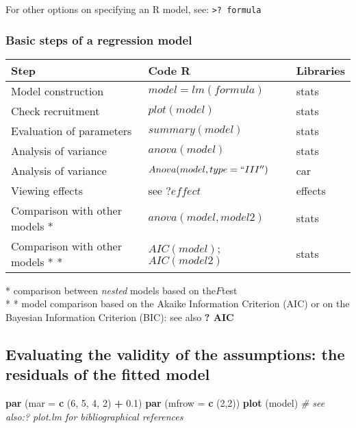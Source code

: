 \documentclass[
]{article}
\newenvironment{Shaded}{\begin{snugshade}}{\end{snugshade}}
\newcommand{\CommentTok}[1]{\textcolor[rgb]{0.56,0.35,0.01}{\textit{#1}}}
\newcommand{\DataTypeTok}[1]{\textcolor[rgb]{0.13,0.29,0.53}{#1}}
\newcommand{\DecValTok}[1]{\textcolor[rgb]{0.00,0.00,0.81}{#1}}
\newcommand{\FloatTok}[1]{\textcolor[rgb]{0.00,0.00,0.81}{#1}}
\newcommand{\KeywordTok}[1]{\textcolor[rgb]{0.13,0.29,0.53}{\textbf{#1}}}
\newcommand{\NormalTok}[1]{#1}
\newcommand{\OperatorTok}[1]{\textcolor[rgb]{0.81,0.36,0.00}{\textbf{#1}}}
\newcommand{\StringTok}[1]{\textcolor[rgb]{0.31,0.60,0.02}{#1}}
\begin{document}
For other options on specifying an R model, see:
\texttt{\textgreater{}?\ formula}

\hypertarget{basic-steps-of-a-regression-model}{%
\subsubsection{Basic steps of a regression
model}\label{basic-steps-of-a-regression-model}}

\begin{longtable}[]{@{}lll@{}}
\toprule
\textbf{Step} & \textbf{Code R} & \textbf{Libraries}\tabularnewline
\midrule
\endhead
Model construction & \(model = lm(formula)\) & stats\tabularnewline
Check recruitment & \(plot(model)\) & stats\tabularnewline
Evaluation of parameters & \(summary (model)\) & stats\tabularnewline
Analysis of variance & \(anova(model)\) & stats\tabularnewline
Analysis of variance & \(Anova(model, type = `` III '')\) &
car\tabularnewline
Viewing effects & see \(? effect\) & effects\tabularnewline
Comparison with other models * & \(anova (model, model2)\) &
stats\tabularnewline
Comparison with other models * * & \(AIC (model)\);\(AIC (model2)\) &
stats\tabularnewline
\bottomrule
\end{longtable}

* comparison between \emph{nested} models based on the\(F\)test\\
* * model comparison based on the Akaike Information Criterion (AIC) or
on the Bayesian Information Criterion (BIC): see also \textbf{? AIC }

\hypertarget{evaluating-the-validity-of-the-assumptions-the-residuals-of-the-fitted-model}{%
\subsection{Evaluating the validity of the assumptions: the residuals of
the fitted
model}\label{evaluating-the-validity-of-the-assumptions-the-residuals-of-the-fitted-model}}

\begin{Shaded}
\begin{Highlighting}[]
\KeywordTok{par}\NormalTok{ (}\DataTypeTok{mar =} \KeywordTok{c}\NormalTok{ (}\DecValTok{6}\NormalTok{, }\DecValTok{5}\NormalTok{, }\DecValTok{4}\NormalTok{, }\DecValTok{2}\NormalTok{) }\OperatorTok{+}\StringTok{ }\FloatTok{0.1}\NormalTok{)}
\KeywordTok{par}\NormalTok{ (}\DataTypeTok{mfrow =} \KeywordTok{c}\NormalTok{ (}\DecValTok{2}\NormalTok{,}\DecValTok{2}\NormalTok{))}
\KeywordTok{plot}\NormalTok{ (model) }\CommentTok{# see also:? plot.lm for bibliographical references}
\end{Highlighting}
\end{Shaded}
\end{document}
